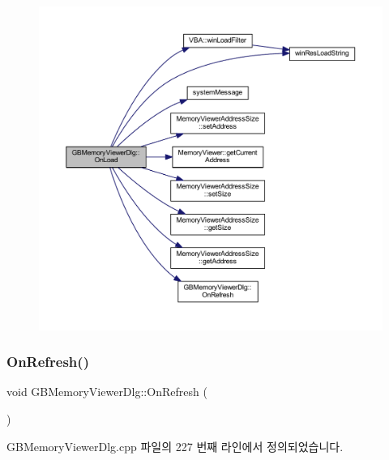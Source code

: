 \begin{figure}[H]
\begin{center}
\leavevmode
\includegraphics[width=350pt]{class_g_b_memory_viewer_dlg_ac81a1ae7e069e1db594879cddbd7b6d8_cgraph}
\end{center}
\end{figure}
\mbox{\label{class_g_b_memory_viewer_dlg_a06c19ee769949ce93010ff891bcac340}} 
\subsubsection{\texorpdfstring{On\+Refresh()}{OnRefresh()}}
{\footnotesize\ttfamily void G\+B\+Memory\+Viewer\+Dlg\+::\+On\+Refresh (\begin{DoxyParamCaption}{ }\end{DoxyParamCaption})\hspace{0.3cm}{\ttfamily [protected]}}



G\+B\+Memory\+Viewer\+Dlg.\+cpp 파일의 227 번째 라인에서 정의되었습니다.


